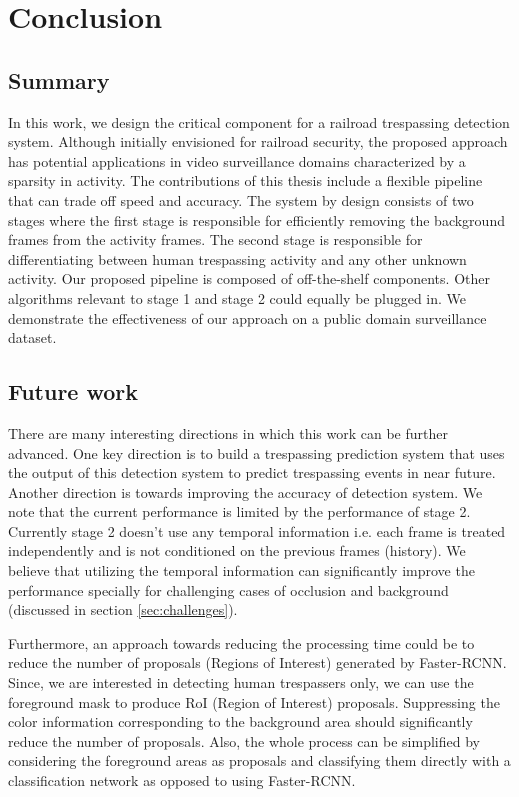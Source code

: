 \section{Conclusion}

\subsection{Summary}
In this work, we design the critical component for a railroad trespassing detection system. Although initially envisioned for railroad security, the proposed approach has potential applications in video surveillance domains characterized by a sparsity in activity. The contributions of this thesis include a flexible pipeline that can trade off speed and accuracy. The system by design consists of two stages where the first stage is responsible for efficiently removing the background frames from the activity frames. The second stage is responsible for differentiating between human trespassing activity and any other unknown activity. Our proposed pipeline is composed of off-the-shelf components. Other algorithms relevant to stage 1 and stage 2 could equally be plugged in. We demonstrate the effectiveness of our approach on a public domain surveillance dataset. 

\subsection{Future work}
There are many interesting directions in which this work can be further advanced. One key direction is to build a trespassing prediction system that uses the output of this detection system to predict trespassing events in near future. Another direction is towards improving the accuracy of detection system. We note that the current performance is limited by the performance of stage 2. Currently stage 2 doesn't use any temporal information i.e. each frame is treated independently and is not conditioned on the previous frames (history). We believe that utilizing the temporal information can significantly improve the performance specially for challenging cases of occlusion and background (discussed in section \ref{sec:challenges}). 

Furthermore, an approach towards reducing the processing time could be to reduce the number of proposals (Regions of Interest) generated by Faster-RCNN. Since, we are interested in detecting human trespassers only, we can use the foreground mask to produce RoI (Region of Interest) proposals. Suppressing the color information corresponding to the background area should significantly reduce the number of proposals. Also, the whole process can be simplified by considering the foreground areas as proposals and classifying them directly with a classification network as opposed to using Faster-RCNN. 

\newpage
